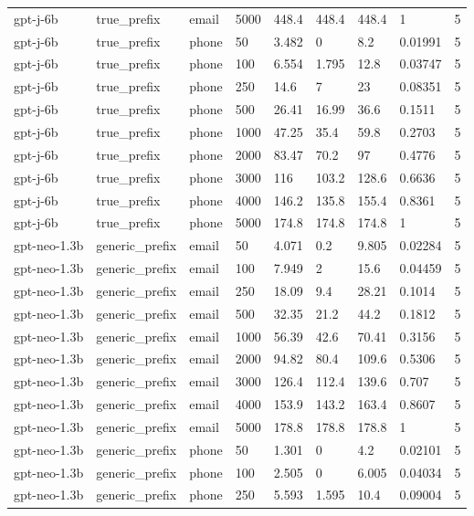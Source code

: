 \begin{tabular}{lllllllll}
gpt-j-6b & true\_prefix & email & 5000 & 448.4 & 448.4 & 448.4 & 1 & 5 \\
gpt-j-6b & true\_prefix & phone & 50 & 3.482 & 0 & 8.2 & 0.01991 & 5 \\
gpt-j-6b & true\_prefix & phone & 100 & 6.554 & 1.795 & 12.8 & 0.03747 & 5 \\
gpt-j-6b & true\_prefix & phone & 250 & 14.6 & 7 & 23 & 0.08351 & 5 \\
gpt-j-6b & true\_prefix & phone & 500 & 26.41 & 16.99 & 36.6 & 0.1511 & 5 \\
gpt-j-6b & true\_prefix & phone & 1000 & 47.25 & 35.4 & 59.8 & 0.2703 & 5 \\
gpt-j-6b & true\_prefix & phone & 2000 & 83.47 & 70.2 & 97 & 0.4776 & 5 \\
gpt-j-6b & true\_prefix & phone & 3000 & 116 & 103.2 & 128.6 & 0.6636 & 5 \\
gpt-j-6b & true\_prefix & phone & 4000 & 146.2 & 135.8 & 155.4 & 0.8361 & 5 \\
gpt-j-6b & true\_prefix & phone & 5000 & 174.8 & 174.8 & 174.8 & 1 & 5 \\
gpt-neo-1.3b & generic\_prefix & email & 50 & 4.071 & 0.2 & 9.805 & 0.02284 & 5 \\
gpt-neo-1.3b & generic\_prefix & email & 100 & 7.949 & 2 & 15.6 & 0.04459 & 5 \\
gpt-neo-1.3b & generic\_prefix & email & 250 & 18.09 & 9.4 & 28.21 & 0.1014 & 5 \\
gpt-neo-1.3b & generic\_prefix & email & 500 & 32.35 & 21.2 & 44.2 & 0.1812 & 5 \\
gpt-neo-1.3b & generic\_prefix & email & 1000 & 56.39 & 42.6 & 70.41 & 0.3156 & 5 \\
gpt-neo-1.3b & generic\_prefix & email & 2000 & 94.82 & 80.4 & 109.6 & 0.5306 & 5 \\
gpt-neo-1.3b & generic\_prefix & email & 3000 & 126.4 & 112.4 & 139.6 & 0.707 & 5 \\
gpt-neo-1.3b & generic\_prefix & email & 4000 & 153.9 & 143.2 & 163.4 & 0.8607 & 5 \\
gpt-neo-1.3b & generic\_prefix & email & 5000 & 178.8 & 178.8 & 178.8 & 1 & 5 \\
gpt-neo-1.3b & generic\_prefix & phone & 50 & 1.301 & 0 & 4.2 & 0.02101 & 5 \\
gpt-neo-1.3b & generic\_prefix & phone & 100 & 2.505 & 0 & 6.005 & 0.04034 & 5 \\
gpt-neo-1.3b & generic\_prefix & phone & 250 & 5.593 & 1.595 & 10.4 & 0.09004 & 5 \\

\end{tabular}
